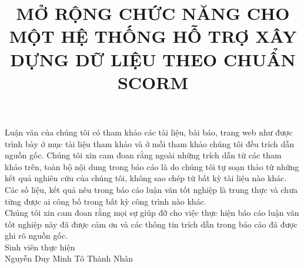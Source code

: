 \documentclass[12pt,a4paper,oneside]{book} %
\title{MỞ RỘNG CHỨC NĂNG CHO MỘT HỆ THỐNG HỖ TRỢ XÂY DỰNG DỮ LIỆU THEO CHUẨN SCORM}
\begin{document}

\coverpage

\frontmatter

\begin{declaration}
	\noindent Luận văn của chúng tôi có tham khảo các tài liệu, bài báo, trang web như được trình bày ở
	mục tài liệu tham khảo và ở mỗi tham khảo chúng tôi đều trích dẫn nguồn gốc. Chúng tôi xin cam
	đoan rằng ngoài những trích dẫn từ các tham khảo trên, toàn bộ nội dung trong báo cáo
	là do chúng tôi tự soạn thảo từ những kết quả nghiên cứu của chúng tôi, không sao chép từ bất
	kỳ tài liệu nào khác.\\
	Các số liệu, kết quả nêu trong báo cáo luận văn tốt nghiệp là trung thực và chưa từng được ai công bố trong bất kỳ công trình nào khác.\\
	Chúng tôi xin cam đoan rằng mọi sự giúp đỡ cho việc thực hiện báo cáo luận văn tốt
	nghiệp này đã được cảm ơn và các thông tin trích dẫn trong báo cáo đã được ghi rõ nguồn gốc.\\
	
\hspace{7cm} Sinh viên thực hiện\\

\hspace{5cm}	Nguyễn Duy Minh \hspace{1.5cm} Tô Thành Nhân\\

\end{declaration}
\end{document}
